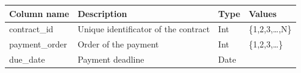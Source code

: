 \documentclass[
]{article}
\begin{document}
\begin{longtable}[]{@{}llll@{}}
\toprule
\begin{minipage}[b]{0.30\columnwidth}\raggedright
Column name\strut
\end{minipage} & \begin{minipage}[b]{0.30\columnwidth}\raggedright
Description\strut
\end{minipage} & \begin{minipage}[b]{0.11\columnwidth}\raggedright
Type\strut
\end{minipage} & \begin{minipage}[b]{0.19\columnwidth}\raggedright
Values\strut
\end{minipage}\tabularnewline
\midrule
\endhead
\begin{minipage}[t]{0.30\columnwidth}\raggedright
contract\_id\strut
\end{minipage} & \begin{minipage}[t]{0.30\columnwidth}\raggedright
Unique identificator of the contract\strut
\end{minipage} & \begin{minipage}[t]{0.11\columnwidth}\raggedright
Int\strut
\end{minipage} & \begin{minipage}[t]{0.19\columnwidth}\raggedright
\{1,2,3,\ldots,N\}\strut
\end{minipage}\tabularnewline
\begin{minipage}[t]{0.30\columnwidth}\raggedright
payment\_order\strut
\end{minipage} & \begin{minipage}[t]{0.30\columnwidth}\raggedright
Order of the payment\strut
\end{minipage} & \begin{minipage}[t]{0.11\columnwidth}\raggedright
Int\strut
\end{minipage} & \begin{minipage}[t]{0.19\columnwidth}\raggedright
\{1,2,3,\ldots\}\strut
\end{minipage}\tabularnewline
\begin{minipage}[t]{0.30\columnwidth}\raggedright
due\_date\strut
\end{minipage} & \begin{minipage}[t]{0.30\columnwidth}\raggedright
Payment deadline\strut
\end{minipage} & \begin{minipage}[t]{0.11\columnwidth}\raggedright
Date\strut
\end{minipage} & \begin{minipage}[t]{0.19\columnwidth}\raggedright

\end{minipage}
\end{longtable}
\end{document}
